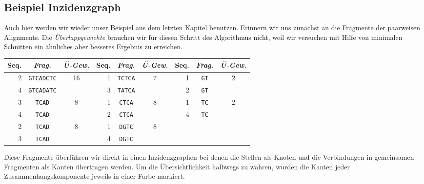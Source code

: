 \subsection{Beispiel Inzidenzgraph}

Auch hier werden wir wieder unser Beispiel aus dem letzten Kapitel benutzen. Erinnern wir uns zunächst an die Fragmente der paarweisen Alignments. Die \emph{Überlappgewichte} brauchen wir für diesen Schritt des Algorithmus nicht, weil wir versuchen mit Hilfe von minimalen Schnitten ein ähnliches aber besseres Ergebnis zu erreichen.

\begin{tabular}{r|c|c||r|c|c||r|c|c}
	Seq. & \emph{Frag.} & \emph{Ü-Gew.} & Seq. & \emph{Frag.} & \emph{Ü-Gew.} & Seq. & \emph{Frag.} & \emph{Ü-Gew.}\\
	\hline
	2 & \texttt{GTCADCTC} & \multirow{2}{*}{16} & 1 & \texttt{TCTCA} & \multirow{2}{*}{7} & 1 & \texttt{GT} &\multirow{2}{*}{2} \\
	4 & \texttt{GTCADATC} &                     & 3 & \texttt{TATCA} &                     & 2 & \texttt{GT} & \\
	3 & \texttt{TCAD} & \multirow{2}{*}{8} & 1 & \texttt{CTCA} & \multirow{2}{*}{8} & 1 & \texttt{TC} & \multirow{2}{*}{2} \\
	4 & \texttt{TCAD} &                     & 2 & \texttt{CTCA} &                          & 4 & \texttt{TC} & \\
	2 & \texttt{TCAD} & \multirow{2}{*}{8} & 1 & \texttt{DGTC} & \multirow{2}{*}{8} &    &   & \\
	3 & \texttt{TCAD} &                     & 4 & \texttt{DGTC} &                     &    &   & \\
\end{tabular}

Diese Fragmente überführen wir direkt in einen Inzidenzgraphen bei denen die Stellen als Knoten und die Verbindungen in gemeinsamen Fragmenten als Kanten übertragen werden. Um die Übersichtlichkeit halbwegs zu wahren, wurden die Kanten jeder Zusammenhangskomponente jeweils in einer Farbe markiert.

